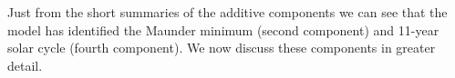 \documentclass{article}
\begin{document}
%
%
Just from the short summaries of the additive components we can see that the model has identified the Maunder minimum (second component) and 11-year solar cycle (fourth component).
We now discuss these components in greater detail.

%
%
%
%
\end{document}
